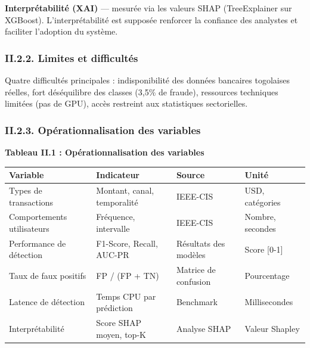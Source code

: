 \documentclass[
  12pt,
]{article}
\newcounter{none} %
\begin{document}
\textbf{Interprétabilité (XAI)} — mesurée via les valeurs SHAP
(TreeExplainer sur XGBoost). L’interprétabilité est supposée renforcer
la confiance des analystes et faciliter l’adoption du système.

\subsubsection{II.2.2. Limites et
difficultés}\label{ii.2.2.-limites-et-difficultuxe9s}

Quatre difficultés principales : indisponibilité des données bancaires
togolaises réelles, fort déséquilibre des classes (3,5\% de fraude),
ressources techniques limitées (pas de GPU), accès restreint aux
statistiques sectorielles.

\subsubsection{II.2.3. Opérationnalisation des
variables}\label{ii.2.3.-opuxe9rationnalisation-des-variables}

\textbf{Tableau II.1 : Opérationnalisation des variables}

{\def\LTcaptype{none} %
\begin{longtable}[]{@{}
  >{\raggedright\arraybackslash}p{}
  >{\raggedright\arraybackslash}p{}
  >{\raggedright\arraybackslash}p{}
  >{\raggedright\arraybackslash}p{}@{}}
\toprule\noalign{}
\begin{minipage}[b]{\linewidth}\raggedright
Variable
\end{minipage} & \begin{minipage}[b]{\linewidth}\raggedright
Indicateur
\end{minipage} & \begin{minipage}[b]{\linewidth}\raggedright
Source
\end{minipage} & \begin{minipage}[b]{\linewidth}\raggedright
Unité
\end{minipage} \\
\midrule\noalign{}
\endhead
\bottomrule\noalign{}
\endlastfoot
Types de transactions & Montant, canal, temporalité & IEEE-CIS & USD,
catégories \\
Comportements utilisateurs & Fréquence, intervalle & IEEE-CIS & Nombre,
secondes \\
Performance de détection & F1-Score, Recall, AUC-PR & Résultats des
modèles & Score {[}0-1{]} \\
Taux de faux positifs & FP / (FP + TN) & Matrice de confusion &
Pourcentage \\
Latence de détection & Temps CPU par prédiction & Benchmark &
Millisecondes \\
Interprétabilité & Score SHAP moyen, top-K & Analyse SHAP & Valeur
Shapley \\
\end{longtable}
}
\end{document}
